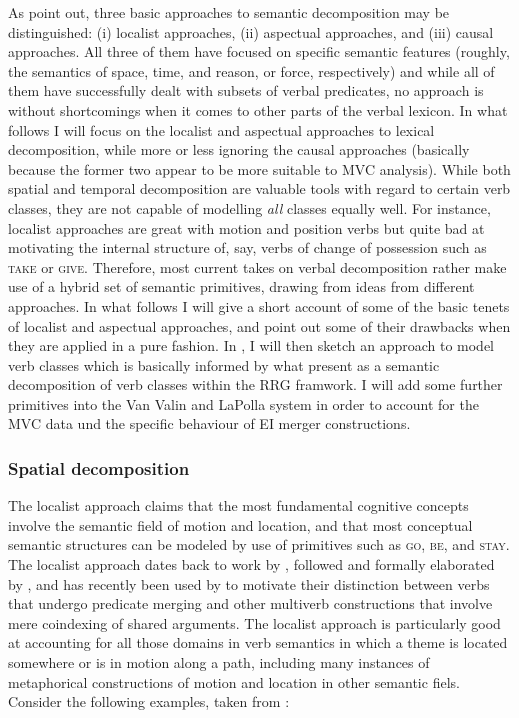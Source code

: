 As \citet{levin2005argument} point out, three basic approaches to semantic decomposition may be distinguished: (i) localist approaches, (ii) aspectual approaches, and (iii) causal approaches. All three of them have focused on specific semantic features (roughly, the semantics of space, time, and reason, or force, respectively) and while all of them have successfully dealt with subsets of verbal predicates, no approach is without shortcomings when it comes to other parts of the verbal lexicon. In what follows I will focus on the localist and aspectual approaches to lexical decomposition, while more or less ignoring the causal approaches (basically because the former two appear to be more suitable to MVC analysis). While both spatial and temporal decomposition are valuable tools with regard to certain verb classes, they are not capable of modelling \textit{all} classes equally well. For instance, localist approaches are great with motion and position verbs but quite bad at motivating the internal structure of, say, verbs of change of possession such as \textsc{take} or \textsc{give}. Therefore, most current takes on verbal decomposition rather make use of a hybrid set of semantic primitives, drawing from ideas from different approaches. In what follows I will give a short account of some of the basic tenets of localist and aspectual approaches, and point out some of their drawbacks when they are applied in a pure fashion. In , I will then sketch an approach to model verb classes which is basically informed by what \citet{van1997syntax} present as a semantic decomposition of verb classes within the RRG framwork. I will add some further primitives into the Van Valin and LaPolla system in order to account for the MVC data und the specific behaviour of EI merger constructions.

\subsubsection{Spatial decomposition}

The localist approach claims that the most fundamental cognitive concepts involve the semantic field of motion and location, and that most conceptual semantic structures can be modeled by use of primitives such as \textsc{go}, \textsc{be}, and \textsc{stay}. The localist approach dates back to work by \citet{gruber1965studies}, followed and formally elaborated by \citet{Jackendoff1990}, and has recently been used by \citet{baker2010complex} to motivate their distinction between verbs that undergo predicate merging and other multiverb constructions that involve mere coindexing of shared arguments. The localist approach is particularly good at accounting for all those domains in verb semantics in which a theme is located somewhere or is in motion along a path, including many instances of metaphorical constructions of motion and location in other semantic fiels. Consider the following examples, taken from \citet[25]{Jackendoff1990}:

